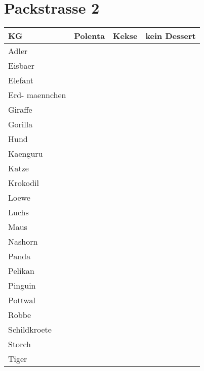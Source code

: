 \documentclass[14pt]{article}
\begin{document}
\section{Packstrasse 2}

\begin{tabular}{l|l|l|l}
  \toprule
  KG  &Polenta&Kekse&kein Dessert\\
  \midrule


Adler&&&\\
\midrule

Eisbaer&&&\\
\midrule

Elefant&&&\\
\midrule

Erd-
maennchen&&&\\
\midrule

Giraffe&&&\\
\midrule

Gorilla&&&\\
\midrule

Hund&&&\\
\midrule

Kaenguru&&&\\
\midrule

Katze&&&\\
\midrule

Krokodil&&&\\
\midrule

Loewe&&&\\
\midrule

Luchs&&&\\
\midrule

Maus&&&\\
\midrule

Nashorn&&&\\
\midrule

Panda&&&\\
\midrule

Pelikan&&&\\
\midrule

Pinguin&&&\\
\midrule

Pottwal&&&\\
\midrule

Robbe&&&\\
\midrule

Schildkroete&&&\\
\midrule

Storch&&&\\
\midrule

Tiger&&&\\
\end{tabular}
\newpage
\end{document}
